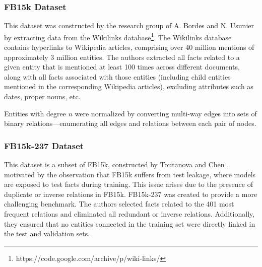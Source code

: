 \subsubsection{FB15k Dataset}

This dataset was constructed by the research group of A. Bordes and N. Usunier \cite{bordes2013translating} by extracting data from the Wikilinks database\footnote{https://code.google.com/archive/p/wiki-links/}. The Wikilinks database contains hyperlinks to Wikipedia articles, comprising over 40 million mentions of approximately 3 million entities. The authors extracted all facts related to a given entity that is mentioned at least 100 times across different documents, along with all facts associated with those entities (including child entities mentioned in the corresponding Wikipedia articles), excluding attributes such as dates, proper nouns, etc. 

Entities with degree \(n\) were normalized by converting multi-way edges into sets of binary relations—enumerating all edges and relations between each pair of nodes.


\subsubsection{FB15k-237 Dataset}

This dataset is a subset of FB15k, constructed by Toutanova and Chen \cite{toutanova2015observed}, motivated by the observation that FB15k suffers from test leakage, where models are exposed to test facts during training. This issue arises due to the presence of duplicate or inverse relations in FB15k. FB15k-237 was created to provide a more challenging benchmark. The authors selected facts related to the 401 most frequent relations and eliminated all redundant or inverse relations. Additionally, they ensured that no entities connected in the training set were directly linked in the test and validation sets.




